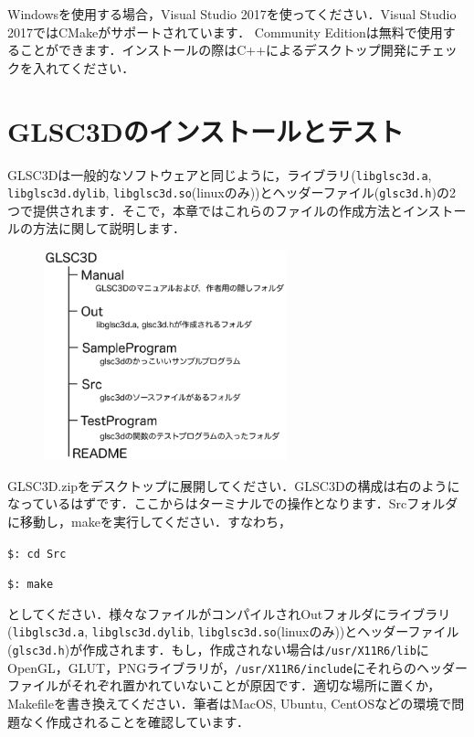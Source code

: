 \documentclass[platex,a4paper,12pt]{jsarticle}%
\begin{document}
Windowsを使用する場合，Visual Studio 2017を使ってください．Visual Studio 2017ではCMakeがサポートされています．
Community Editionは無料で使用することができます．インストールの際はC++によるデスクトップ開発にチェックを入れてください．

\newpage
\section{GLSC3Dのインストールとテスト}

GLSC3Dは一般的なソフトウェアと同じように，ライブラリ(\verb|libglsc3d.a|, \verb|libglsc3d.dylib|, \verb|libglsc3d.so|(linuxのみ))とヘッダーファイル(\verb|glsc3d.h|)の2つで提供されます．そこで，本章ではこれらのファイルの作成方法とインストールの方法に関して説明します．

\begin{figure}
\vspace{-1\baselineskip}
	\includegraphics[width=70mm]{./Figures/eps/006.eps}
\end{figure}

GLSC3D.zipをデスクトップに展開してください．GLSC3Dの構成は右のようになっているはずです．ここからはターミナルでの操作となります．Srcフォルダに移動し，makeを実行してください．すなわち，

\verb|$: cd Src|

\verb|$: make|

\noindent
としてください．様々なファイルがコンパイルされOutフォルダにライブラリ(\verb|libglsc3d.a|, \verb|libglsc3d.dylib|, \verb|libglsc3d.so|(linuxのみ))とヘッダーファイル(\verb|glsc3d.h|)が作成されます．もし，作成されない場合は\verb|/usr/X11R6/lib|にOpenGL，GLUT，PNGライブラリが，\verb|/usr/X11R6/include|にそれらのヘッダーファイルがそれぞれ置かれていないことが原因です．適切な場所に置くか，Makefileを書き換えてください．筆者はMacOS, Ubuntu, CentOSなどの環境で問題なく作成されることを確認しています．
\end{document}
